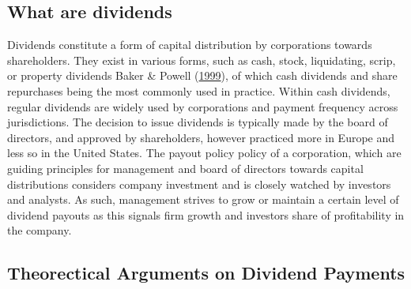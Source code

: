\documentclass[11pt,preprint, authoryear]{elsarticle}
\numberwithin{equation}{section}
\numberwithin{figure}{section}
\numberwithin{table}{section}
\begin{document}
\hypertarget{what-are-dividends}{%
\subsection*{What are dividends}\label{what-are-dividends}}

Dividends constitute a form of capital distribution by corporations
towards shareholders. They exist in various forms, such as cash, stock,
liquidating, scrip, or property dividends Baker \& Powell
(\protect\hyperlink{ref-baker1999corporate}{1999}), of which cash
dividends and share repurchases being the most commonly used in
practice. Within cash dividends, regular dividends are widely used by
corporations and payment frequency across jurisdictions. The decision to
issue dividends is typically made by the board of directors, and
approved by shareholders, however practiced more in Europe and less so
in the United States. The payout policy policy of a corporation, which
are guiding principles for management and board of directors towards
capital distributions considers company investment and is closely
watched by investors and analysts. As such, management strives to grow
or maintain a certain level of dividend payouts as this signals firm
growth and investors share of profitability in the company.

\hypertarget{theorectical-arguments-on-dividend-payments}{%
\subsection*{Theorectical Arguments on Dividend
Payments}\label{theorectical-arguments-on-dividend-payments}}
\end{document}
